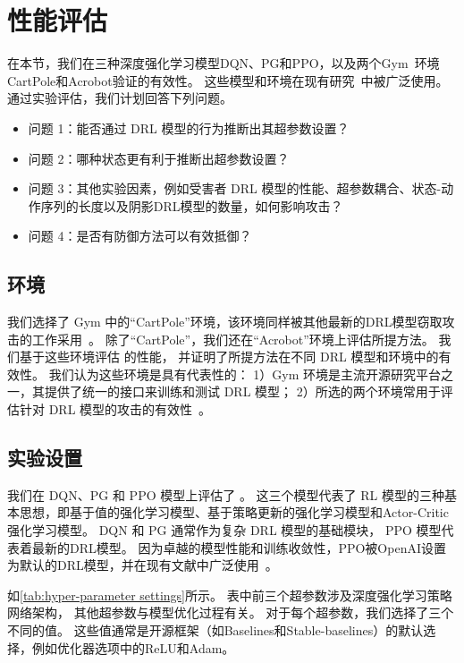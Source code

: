 \section{性能评估}
\label{sec:evaluation}
在本节，我们在三种深度强化学习模型DQN、PG和PPO，以及两个Gym~\cite{BCPSSTZ16}环境CartPole和Acrobot验证\sysname 的有效性。
这些模型和环境在现有研究~\cite{WJWGXS21,CGZXL21,PWZLYS19,GDWKLR20,WGWX21}中被广泛使用。
通过实验评估，我们计划回答下列问题。

\begin{itemize}
    \item 问题 1：能否通过 DRL 模型的行为推断出其超参数设置？
    \item 问题 2：哪种状态更有利于推断出超参数设置？
    \item 问题 3：其他实验因素，例如受害者 DRL 模型的性能、超参数耦合、状态-动作序列的长度以及阴影DRL模型的数量，如何影响攻击？
    \item 问题 4：是否有防御方法可以有效抵御\sysname ？
\end{itemize}

\subsection{环境}
\label{subsec:environments}

我们选择了 Gym 中的“CartPole”环境，该环境同样被其他最新的DRL模型窃取攻击的工作采用~\cite{CGZXL21}。
除了“CartPole”，我们还在“Acrobot”环境上评估所提方法。
我们基于这些环境评估 \sysname 的性能，
并证明了所提方法在不同 DRL 模型和环境中的有效性。
我们认为这些环境是具有代表性的：
1）Gym 环境是主流开源研究平台之一，其提供了统一的接口来训练和测试 DRL 模型；
2）所选的两个环境常用于评估针对 DRL 模型的攻击的有效性~\cite{CGZXL21,IUQJAHN20,PTLBC18}。

\subsection{实验设置}
\label{sec:experimental setup}
我们在 DQN、PG 和 PPO 模型上评估了 \sysname 。
这三个模型代表了 RL 模型的三种基本思想，即基于值的强化学习模型、基于策略更新的强化学习模型和Actor-Critic强化学习模型。
DQN 和 PG 通常作为复杂 DRL 模型的基础模块，
PPO 模型代表着最新的DRL模型。
因为卓越的模型性能和训练收敛性，PPO被OpenAI设置为默认的DRL模型，并在现有文献中广泛使用~\cite{WJWGXS21,CGZXL21,GDWKLR20,WGWX21}。

如\autoref{tab:hyper-parameter settings}所示。
表中前三个超参数涉及深度强化学习策略网络架构，
其他超参数与模型优化过程有关。
对于每个超参数，我们选择了三个不同的值。
这些值通常是开源框架（如Baselines和Stable-baselines）的默认选择，例如优化器选项中的ReLU和Adam。

